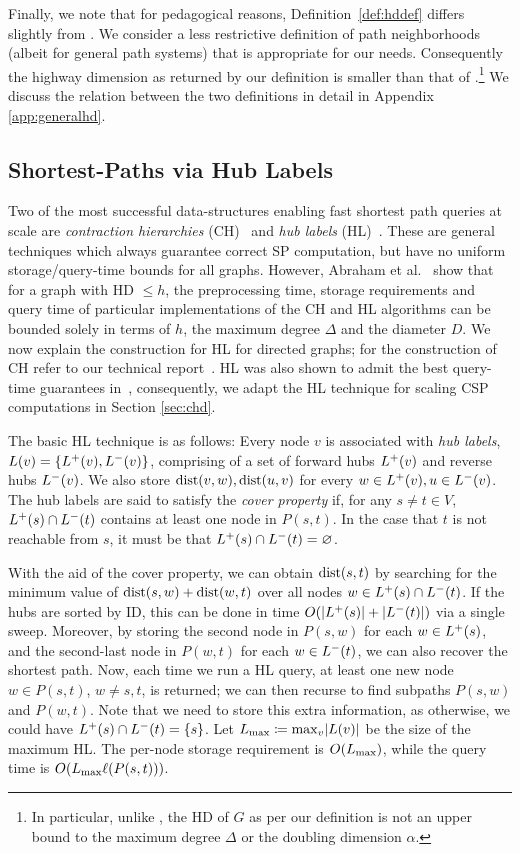 Finally, we note that for pedagogical reasons, Definition~\ref{def:hddef} differs slightly from \cite{highway2013}.
We consider a less restrictive definition of path neighborhoods (albeit for general path systems) that is appropriate for our needs. Consequently the highway dimension as returned by our definition is smaller than that of \cite{highway2013}.\footnote{In particular, unlike \cite{highway2013}, the HD of $G$ as per our definition is not an upper bound to the maximum degree $\Delta$ or the doubling dimension $\alpha$.}
We discuss the relation between the two definitions in detail in Appendix \ref{app:generalhd}. 


\subsection{Shortest-Paths via Hub Labels}
\label{ssec:hldef}

Two of the most successful data-structures enabling fast shortest path queries at scale are \emph{contraction hierarchies} (CH)~\cite{geisberger_ch_definition} and \emph{hub labels} (HL)~\cite{cohen_definition_hl}.
These are general techniques which always guarantee correct SP computation, but have no uniform storage/query-time bounds for all graphs.
However, Abraham et al.~\cite{highway2013} show that for a graph with HD $\leq h$, the preprocessing time, storage requirements and query time of particular implementations of the CH and HL algorithms can be bounded solely in terms of $h$, the maximum degree $\Delta$ and the diameter $D$. 
We now explain the construction for HL for directed graphs; for the construction of CH refer to our technical report~\cite{TechReport}.
HL was also shown to admit the best query-time guarantees in~\cite{highway2013}, consequently, we adapt the HL technique for scaling CSP computations in Section \ref{sec:chd}.

The basic HL technique is as follows:
Every node $v$ is associated with \emph{hub labels}, $L(v) = \crl*{\Lf(v),\Lb(v)}$, comprising of a set of forward hubs $\Lf(v)$ and reverse hubs $\Lb(v)$.
We also store $\dist(v,w),\dist(u,v)$ for every $w\in\Lf(v),u\in\Lb(v)$.
The hub labels are said to satisfy the \emph{cover property} if, for any $s\neq t\in V$, $\Lf(s)\cap\Lb(t)$ contains at least one node in $P(s,t)$.
In the case that $t$ is not reachable from $s$, it must be that $\Lf(s)\cap\Lb(t)=\varnothing$.

With the aid of the cover property, we can obtain $\dist(s,t)$ by searching for the minimum value of $\dist(s,w)+\dist(w,t)$ over all nodes $w\in\Lf(s)\cap\Lb(t)$.
If the hubs are sorted by ID, this can be done in time $\Or(\card{\Lf(s)}+\card{\Lb(t)})$ via a single sweep.
Moreover, by storing the second node in $P(s,w)$ for each $w\in \Lf(s)$, and the second-last node in $P(w,t)$ for each $w\in \Lb(t)$, we can also recover the shortest path.
Now, each time we run a HL query, at least one new node $w\in P(s,t)$, $w\neq s,t$, is returned; we can then recurse to find subpaths $P(s,w)$ and $P(w,t)$.
Note that we need to store this extra information, as otherwise, we could have $\Lf(s)\cap\Lb(t)=\{s\}$.
Let $\Lm \defeq \max_v\abs*{L(v)}$ be the size of the maximum HL.
The per-node storage requirement is $\Or(\Lm)$, while the query time is $\Or(\Lm\ell(P(s,t)))$.

